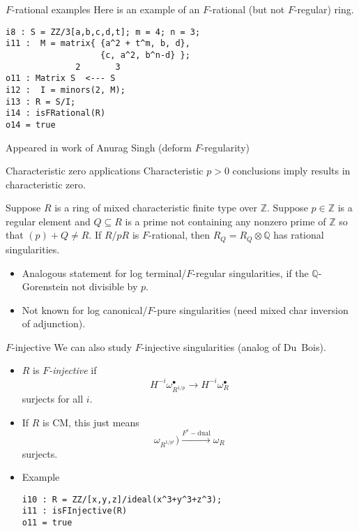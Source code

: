 \documentclass[xcolor=dvipsnames]{beamer}
\newcommand{\memph}[1]{{\color{Red}\emph{#1}}}
\newcommand{\bQ}{\mathbb{Q}}
\newcommand{\bZ}{\mathbb{Z}}
\newcommand{\mydot}{\bullet}
\theoremstyle{remark}
\begin{document}
\begin{frame}[fragile]{$F$-rational examples}
    Here is an example of an $F$-rational (but not $F$-regular) ring.
    \begin{verbatim}
i8 : S = ZZ/3[a,b,c,d,t]; m = 4; n = 3;
i11 :  M = matrix{ {a^2 + t^m, b, d},
                   {c, a^2, b^n-d} };
              2       3
o11 : Matrix S  <--- S
i12 :  I = minors(2, M);
i13 : R = S/I;
i14 : isFRational(R)
o14 = true
\end{verbatim}
Appeared in work of Anurag Singh (deform $F$-regularity)
\end{frame}

\begin{frame}[t]{Characteristic zero applications}
    Characteristic $p > 0$ conclusions imply results in characteristic zero.
    \begin{theorem}[Ma-{$\bullet$}]
        Suppose $R$ is a ring of mixed characteristic finite type over $\bZ$.  Suppose $p \in \bZ$ is a regular element and $Q \subseteq R$ is a prime not containing any nonzero prime of $\bZ$ so that $(p) + Q \neq R$.
        \vskip 9pt
        If $R/pR$ is $F$-rational, then $R_Q = R_Q \otimes \bQ$ has rational singularities.
    \end{theorem}
    \begin{itemize}
    \item<2->Analogous statement for log terminal/$F$-regular singularities, if the $\bQ$-Gorenstein not divisible by $p$.
    \item<3->Not known for log canonical/$F$-pure singularities (need mixed char inversion of adjunction).
    \end{itemize}
\end{frame}

\begin{frame}[fragile]{$F$-injective}
    We can also study $F$-injective singularities (analog of Du~Bois).
    \begin{itemize}
        \item<2->  $R$ is \memph{$F$-injective} if
        \[
        H^{-i} \omega_{R^{1/p}}^{\mydot} \to H^{-i} \omega_{R}^{\mydot}
        \]
        surjects for all $i$.
        \item<3->  If $R$ is CM, this just means
        \[
            \omega_{R^{1/p^e}}) \xrightarrow{F^e-\mathrm{dual}} \omega_R
        \]
        surjects.
        \item<4->  Example
        \begin{verbatim}
i10 : R = ZZ/[x,y,z]/ideal(x^3+y^3+z^3);
i11 : isFInjective(R)
o11 = true
        \end{verbatim}
    \end{itemize}
\end{frame}
\end{document}
